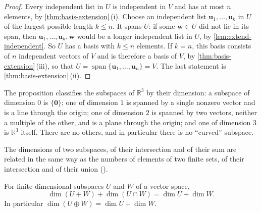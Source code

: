 \begin{proof}
Every independent list in $U$ is independent in $V$ and has at most $n$ elements, by \cref{thm:basis-extension}\,(i). Choose an independent list $\mathbf u_1,\ldots,\mathbf u_k$ in $U$ of the largest possible length $k\le n$. It spans $U$: if some $\mathbf w\in U$ did not lie in its span, then $\mathbf u_1,\ldots,\mathbf u_k,\mathbf w$ would be a longer independent list in $U$, by \cref{lem:extend-independent}. So $U$ has a basis with $k\le n$ elements. If $k=n$, this basis consists of $n$ independent vectors of $V$ and is therefore a basis of $V$, by \cref{thm:basis-extension}\,(iii), so that $U=\operatorname{span}\{\mathbf u_1,\ldots,\mathbf u_n\}=V$. The last statement is \cref{thm:basis-extension}\,(ii).
\end{proof}

The proposition classifies the subspaces of $\mathbb R^3$ by their dimension: a subspace of dimension $0$ is $\{\mathbf 0\}$; one of dimension $1$ is spanned by a single nonzero vector and is a line through the origin; one of dimension $2$ is spanned by two vectors, neither a multiple of the other, and is a plane through the origin; and one of dimension $3$ is $\mathbb R^3$ itself. There are no others, and in particular there is no ``curved'' subspace.

The dimensions of two subspaces, of their intersection and of their sum are related in the same way as the numbers of elements of two finite sets, of their intersection and of their union ().

\begin{theorem}
\label{thm:dimension-formula}
For finite-dimensional subspaces $U$ and $W$ of a vector space,
\[
\dim(U+W)+\dim(U\cap W)=\dim U+\dim W .
\]
In particular $\dim(U\oplus W)=\dim U+\dim W$.
\end{theorem}

